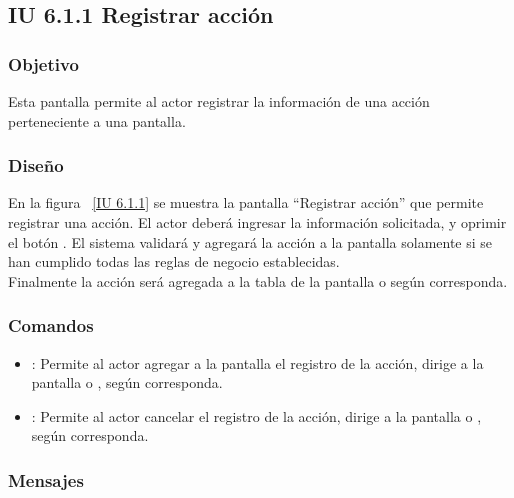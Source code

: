\subsection{IU 6.1.1 Registrar acción}

\subsubsection{Objetivo}
	
	Esta pantalla permite al actor registrar la información de una acción perteneciente a una pantalla.

\subsubsection{Diseño}

    En la figura ~\ref{IU 6.1.1} se muestra la pantalla ``Registrar acción'' que permite registrar una acción. El actor deberá ingresar la información solicitada,
    y oprimir el botón . El sistema validará y agregará la acción a la pantalla solamente si se han cumplido todas las reglas de negocio establecidas.  \\
    
    Finalmente la acción será agregada a la tabla de la pantalla  o  según corresponda. \\



\subsubsection{Comandos}
\begin{itemize}
	\item {}: Permite al actor agregar a la pantalla el registro de la acción, dirige a la pantalla  o , según corresponda.
	\item {}: Permite al actor cancelar el registro de la acción, dirige a la pantalla  o , según corresponda.
\end{itemize}

\subsubsection{Mensajes}

